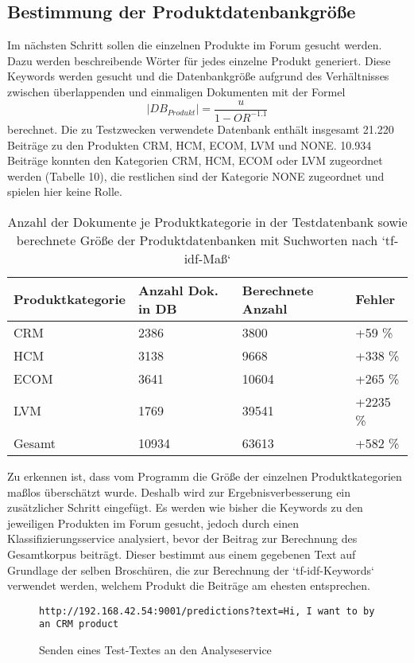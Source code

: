\subsection{Bestimmung der Produktdatenbankgröße}

Im nächsten Schritt sollen die einzelnen Produkte im Forum gesucht werden. Dazu werden beschreibende Wörter für jedes einzelne Produkt generiert. Diese Keywords werden gesucht und die Datenbankgröße aufgrund des Verhältnisses zwischen überlappenden und einmaligen Dokumenten mit der Formel \[|DB_{Produkt}| = \frac{u}{1-OR^{-1.1}}\] \cite{lu2008efficient} berechnet. Die zu Testzwecken verwendete Datenbank enthält insgesamt 21.220 Beiträge zu den Produkten CRM, HCM, ECOM, LVM und NONE. 10.934 Beiträge konnten den Kategorien CRM, HCM, ECOM oder LVM zugeordnet werden (Tabelle 10), die restlichen sind der Kategorie NONE zugeordnet und spielen hier keine Rolle.

\begin{table}[h!]
\centering 
\begin{tabular}{ | p{3cm} | l | l | l |}
\hline
\textbf{Produktkategorie} & \textbf{Anzahl Dok. in DB} & \textbf{Berechnete Anzahl} & \textbf{Fehler}\\ \hline
CRM & 2386 & 3800 & +59 \%\\ \hline
HCM & 3138 & 9668 & +338 \%\\ \hline
ECOM & 3641 & 10604 & +265 \%\\ \hline
LVM & 1769 & 39541 & +2235 \%\\ \hline
Gesamt & 10934 & 63613 & +582 \% \\ \hline
\end{tabular}
\caption{Anzahl der Dokumente je Produktkategorie in der Testdatenbank sowie berechnete Größe der Produktdatenbanken mit Suchworten nach `tf-idf-Maß`}
\end{table}

Zu erkennen ist, dass vom Programm die Größe der einzelnen Produktkategorien maßlos überschätzt wurde. Deshalb wird zur Ergebnisverbesserung ein zusätzlicher Schritt eingefügt. Es werden wie bisher die Keywords zu den jeweiligen Produkten im Forum gesucht, jedoch durch einen Klassifizierungsservice \cite{n2o} analysiert, bevor der Beitrag zur Berechnung des Gesamtkorpus beiträgt. Dieser bestimmt aus einem gegebenen Text auf Grundlage der selben Broschüren, die zur Berechnung der `tf-idf-Keywords` verwendet werden, welchem Produkt die Beiträge am ehesten entsprechen.

\begin{figure}[h!]
\begin{lstlisting}[language=HTML5]
http://192.168.42.54:9001/predictions?text=Hi, I want to by an CRM product
\end{lstlisting}
\caption{Senden eines Test-Textes an den Analyseservice}
\end{figure}


